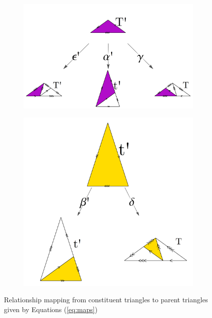 \documentclass[
  oneside,
  11pt, a4paper,
  footinclude=true,
  headinclude=true,
  cleardoublepage=empty
]{scrbook}
\begin{document}
\begin{figure}[H]
        \begin{subfigure}[t]{0.6\textwidth}
                \includegraphics[width=\textwidth]{TLgraph}
        \end{subfigure}\hfill
        \begin{subfigure}[t]{0.4\textwidth}
                \includegraphics[width=\textwidth]{tslgraph}
        \end{subfigure}  
        \caption{Relationship mapping from constituent triangles to parent triangles given by Equations (\ref{eq:maps})} 
        \label{fig:functionmap}                    
\end{figure}
\end{document}
